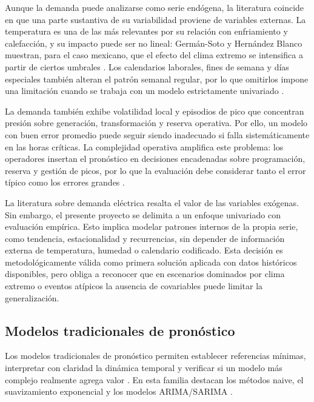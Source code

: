 Aunque la demanda puede analizarse como serie endógena, la literatura coincide en que una parte sustantiva de su variabilidad proviene de variables externas. La temperatura es una de las más relevantes por su relación con enfriamiento y calefacción, y su impacto puede ser no lineal: Germán-Soto y Hernández Blanco muestran, para el caso mexicano, que el efecto del clima extremo se intensifica a partir de ciertos umbrales \parencite{germansoto2025}. Los calendarios laborales, fines de semana y días especiales también alteran el patrón semanal regular, por lo que omitirlos impone una limitación cuando se trabaja con un modelo estrictamente univariado \parencite{alfares2002,hong2020}.

La demanda también exhibe volatilidad local y episodios de pico que concentran presión sobre generación, transformación y reserva operativa. Por ello, un modelo con buen error promedio puede seguir siendo inadecuado si falla sistemáticamente en las horas críticas. La complejidad operativa amplifica este problema: los operadores insertan el pronóstico en decisiones encadenadas sobre programación, reserva y gestión de picos, por lo que la evaluación debe considerar tanto el error típico como los errores grandes \parencite{gross1987,hong2020}.

La literatura sobre demanda eléctrica resalta el valor de las variables exógenas. Sin embargo, el presente proyecto se delimita a un enfoque univariado con evaluación empírica. Esto implica modelar patrones internos de la propia serie, como tendencia, estacionalidad y recurrencias, sin depender de información externa de temperatura, humedad o calendario codificado. Esta decisión es metodológicamente válida como primera solución aplicada con datos históricos disponibles, pero obliga a reconocer que en escenarios dominados por clima extremo o eventos atípicos la ausencia de covariables puede limitar la generalización.

\subsection{Modelos tradicionales de pronóstico}

Los modelos tradicionales de pronóstico permiten establecer referencias mínimas, interpretar con claridad la dinámica temporal y verificar si un modelo más complejo realmente agrega valor \parencite{hyndman2021,box2015}. En esta familia destacan los métodos naive, el suavizamiento exponencial y los modelos ARIMA/SARIMA \parencite{hyndman2021,petropoulos2022}.

